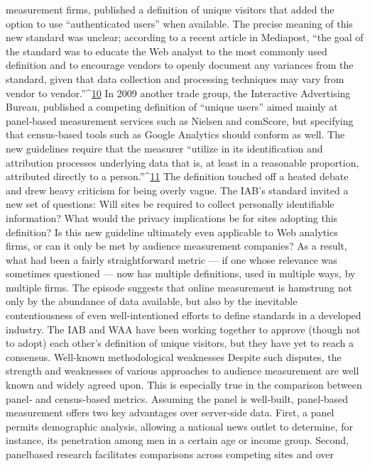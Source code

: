 measurement firms, published a definition of unique visitors that added
the option to use ``authenticated users'' when available. The precise
meaning of this new standard was unclear; according to a recent article in
Mediapost, ``the goal of the standard was to educate the Web analyst to the
most commonly used definition and to encourage vendors to openly
document any variances from the standard, given that data collection and
processing techniques may vary from vendor to vendor.''^{\href{#endnotes}{10}}
In 2009 another trade group, the Interactive Advertising Bureau,
published a competing definition of ``unique users'' aimed mainly at
panel‐based measurement services such as Nielsen and comScore, but
specifying that census‐based tools such as Google Analytics should
conform as well. The new guidelines require that the measurer ``utilize in
its identification and attribution processes underlying data that is, at least
in a reasonable proportion, attributed directly to a person.''^{\href{#endnotes}{11}}
The definition touched off a heated debate and drew heavy criticism for
being overly vague. The IAB’s standard invited a new set of questions:
Will sites be required to collect personally identifiable information? What
would the privacy implications be for sites adopting this definition? Is this
new guideline ultimately even applicable to Web analytics firms, or can it
only be met by audience measurement companies?
As a result, what had been a fairly straightforward metric — if one whose
relevance was sometimes questioned — now has multiple definitions,
used in multiple ways, by multiple firms. The episode suggests that online
measurement is hamstrung not only by the abundance of data available,
but also by the inevitable contentiousness of even well‐intentioned efforts
to define standards in a developed industry. The IAB and WAA have been
working together to approve (though not to adopt) each other’s definition
of unique visitors, but they have yet to reach a consensus.
Well‐known methodological weaknesses
Despite such disputes, the strength and weaknesses of various approaches
to audience measurement are well known and widely agreed upon. This is
especially true in the comparison between panel‐ and census‐based
metrics.
Assuming the panel is well‐built, panel‐based measurement offers two
key advantages over server‐side data. First, a panel permits demographic
analysis, allowing a national news outlet to determine, for instance, its
penetration among men in a certain age or income group. Second, panelbased
research facilitates comparisons across competing sites and over
